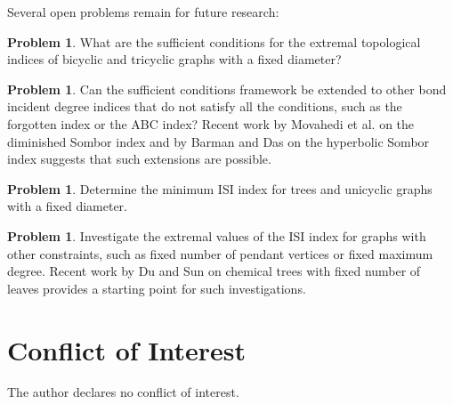 \documentclass[12pt]{article}
\theoremstyle{definition}
\newtheorem{problem}[theorem]{Problem}
\begin{document}
Several open problems remain for future research:

\begin{problem}
What are the sufficient conditions for the extremal topological indices of bicyclic and tricyclic graphs with a fixed diameter?
\end{problem}

\begin{problem}
Can the sufficient conditions framework be extended to other bond incident degree indices that do not satisfy all the conditions, such as the forgotten index or the ABC index? Recent work by Movahedi et al. \cite{movahedi2026diminished} on the diminished Sombor index and by Barman and Das \cite{barman2026geometric} on the hyperbolic Sombor index suggests that such extensions are possible.
\end{problem}

\begin{problem}
Determine the minimum ISI index for trees and unicyclic graphs with a fixed diameter.
\end{problem}

\begin{problem}
Investigate the extremal values of the ISI index for graphs with other constraints, such as fixed number of pendant vertices or fixed maximum degree. Recent work by Du and Sun \cite{du2024bond} on chemical trees with fixed number of leaves provides a starting point for such investigations.
\end{problem}

\section*{Conflict of Interest}

The author declares no conflict of interest.
\end{document}
